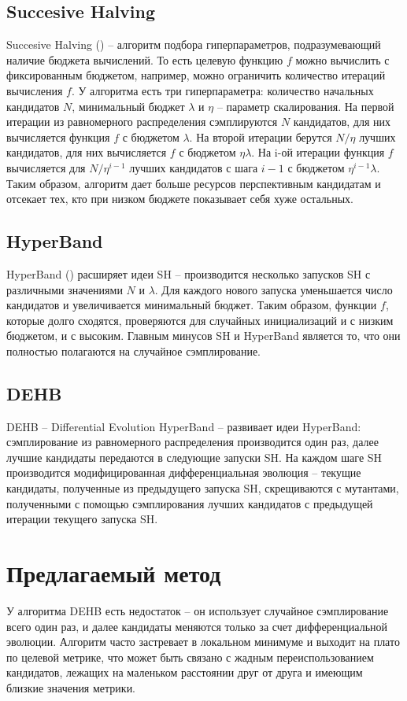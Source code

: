\documentclass{article}
\begin{document}
\subsection{Succesive Halving}
Succesive Halving (\cite{jamieson2015nonstochastic}) -- алгоритм подбора гиперпараметров, подразумевающий наличие бюджета вычислений. То есть целевую функцию $f$ можно вычислить с фиксированным бюджетом, например, можно ограничить количество итераций вычисления $f$. У алгоритма есть три гиперпараметра: количество начальных кандидатов $N$, минимальный бюджет $\lambda$ и $\eta$ -- параметр скалирования. На первой итерации из равномерного распределения сэмплируются $N$ кандидатов, для них вычисляется функция $f$ с бюджетом $\lambda$. На второй итерации берутся $N/\eta$ лучших кандидатов, для них вычисляется $f$ с бюджетом $\eta\lambda$. На i-ой итерации функция $f$ вычисляется для $N/\eta^{i - 1}$ лучших кандидатов с шага $i - 1$ с бюджетом $\eta^{i - 1}\lambda$. Таким образом, алгоритм дает больше ресурсов перспективным кандидатам и отсекает тех, кто при низком бюджете показывает себя хуже остальных.

\subsection{HyperBand}
HyperBand (\cite{li2018hyperband}) расширяет идеи SH -- производится несколько запусков SH с различными значениями $N$ и $\lambda$. Для каждого нового запуска уменьшается число кандидатов и увеличивается минимальный бюджет. Таким образом, функции $f$, которые долго сходятся, проверяются для случайных инициализаций и с низким бюджетом, и с высоким. Главным минусов SH и HyperBand является то, что они полностью полагаются на случайное сэмплирование.

\subsection{DEHB}
DEHB -- Differential Evolution HyperBand -- развивает идеи HyperBand: сэмплирование из равномерного распределения производится один раз, далее лучшие кандидаты передаются в следующие запуски SH. На каждом шаге SH производится модифицированная дифференциальная эволюция -- текущие кандидаты, полученные из предыдущего запуска SH, скрещиваются с мутантами, полученными с помощью сэмплирования лучших кандидатов с предыдущей итерации текущего запуска SH.

\section{Предлагаемый метод}
У алгоритма DEHB есть недостаток -- он использует случайное сэмплирование всего один раз, и далее кандидаты меняются только за счет дифференциальной эволюции. Алгоритм часто застревает в локальном минимуме и выходит на плато по целевой метрике, что может быть связано с жадным переиспользованием кандидатов, лежащих на маленьком расстоянии друг от друга и имеющим близкие значения метрики. 
\end{document}
